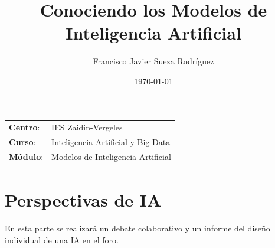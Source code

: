 


\title{
\vspace{10ex}
\normalfont \normalsize
\huge \textbf{Conociendo los Modelos de Inteligencia Artificial}
}
\author{Francisco Javier Sueza Rodríguez}
\date{\normalsize\today}

\glsenablehyper
\makeglossaries
{}




\maketitle

\thispagestyle{empty}

\vspace{75ex}

\begin{center}
    \begin{tabular}{l l}
        \textbf{Centro}: & IES Zaidin-Vergeles \\
        \textbf{Curso}: & Inteligencia Artificial y Big Data\\
        \textbf{Módulo}: & Modelos de Inteligencia Artificial \\
    \end{tabular}
\end{center}

\newpage

\begingroup
\hypersetup{linkcolor=black}
\tableofcontents
\endgroup

\newpage

\begingroup
\hypersetup{linkcolor=black}
\listoffigures             
\endgroup

\newpage

\section{Perspectivas de IA}
En esta parte se realizará un debate colaborativo y un informe del diseño individual de una IA en el foro.                               


